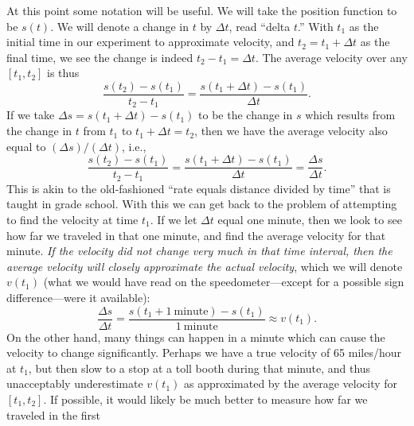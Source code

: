 At this point some notation will be useful.  We will
take the position function to be $s(t)$.
We will denote a change in $t$ by $\Delta t$, read
``delta $t$.''\footnotemark\hphantom{. }
With $t_1$ as the initial time in our experiment to approximate
velocity, and  $t_2=t_1+\Delta t$ as the final
time, we see the change is indeed $t_2-t_1=\Delta t$.  
The average velocity over any $[t_1,t_2]$
is thus
$$\frac{s(t_2)-s(t_1)}{t_2-t_1}
=\frac{s(t_1+\Delta t)-s(t_1)}{\Delta t}.$$
%
If we take $\Delta s=s(t_1+\Delta t)-s(t_1)$ to be
the change in $s$ which results from the change in
$t$ from $t_1$ to $t_1+\Delta t=t_2$, then we have
the average velocity also equal to
$(\Delta s)/(\Delta t)$, i.e., 
$$\frac{s(t_2)-s(t_1)}{t_2-t_1}
=\frac{s(t_1+\Delta t)-s(t_1)}{\Delta t}=
\frac{\Delta s}{\Delta t}.$$
This is akin to  the old-fashioned ``rate equals distance 
divided by time'' that is taught in grade school.\footnotemark 
%
%
With this we can get back to the problem of attempting
to find the velocity at time $t_1$.  
If we let $\Delta t$ equal one minute, then we look
to see how far we traveled in that one minute,
and find the average velocity for that minute.  {\it If 
the velocity did not change very much in that time
interval, then the average velocity will closely 
approximate the actual velocity}, which we will 
denote $v(t_1)$ (what we would have read on the
speedometer---except for a possible sign difference---were it available): 
$$\frac{\Delta s}{\Delta t}=\frac{s(t_1+1\ \text{minute})-s(t_1)}
{1\ \text{minute}}\approx v(t_1).$$
On the other hand, many things can happen in a minute
which can cause the velocity to change significantly.
Perhaps we have a true velocity of 65  miles/hour at $t_1$,
but then slow to a stop at a 
toll booth during that minute, and thus unacceptably underestimate
$v(t_1)$ as approximated by the average velocity for $[t_1,t_2]$. 
If possible, it would likely be
much better to measure how far we traveled in the first
